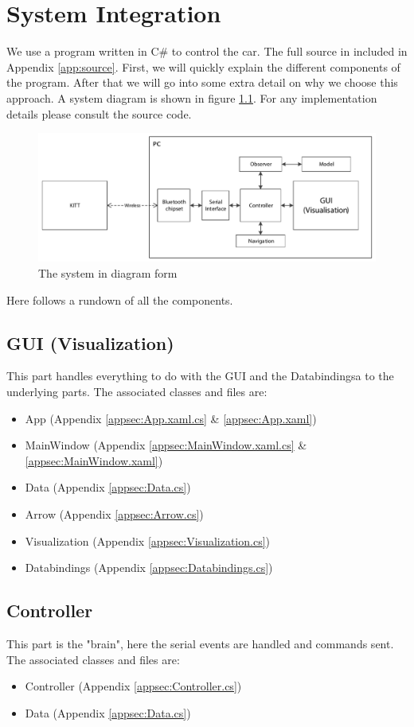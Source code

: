 \documentclass[final]{scrreprt} %
\begin{document}
\chapter{System Integration}
\label{ch:system-integration}
We use a program written in C\# to control the car.
The full source in included in Appendix \ref{app:source}.
First, we will quickly explain the different components of the program.
After that we will go into some extra detail on why we choose this approach.
A system diagram is shown in figure \ref{fig:system-diagram}.
For any implementation details please consult the source code.
\begin{figure}[H]
	\centering    	
    	\includegraphics[width=\textwidth]{resources/system-diagram.pdf}
    	\caption{The system in diagram form}
    	\label{fig:system-diagram}
\end{figure}
Here follows a rundown of all the components.
\section{GUI (Visualization)}
This part handles everything to do with the GUI and the Databindingsa to the underlying parts.
The associated classes and files are:
\begin{itemize}
\item App (Appendix \ref{appsec:App.xaml.cs} \& \ref{appsec:App.xaml})
\item MainWindow (Appendix \ref{appsec:MainWindow.xaml.cs} \& \ref{appsec:MainWindow.xaml})
\item Data (Appendix \ref{appsec:Data.cs})
\item Arrow (Appendix \ref{appsec:Arrow.cs})
\item Visualization (Appendix \ref{appsec:Visualization.cs})
\item Databindings (Appendix \ref{appsec:Databindings.cs})
\end{itemize}
\section{Controller}
This part is the "brain", here the serial events are handled and commands sent.
The associated classes and files are:
\begin{itemize}
\item Controller (Appendix \ref{appsec:Controller.cs})
\item Data (Appendix \ref{appsec:Data.cs})
\end{itemize}
\end{document}

